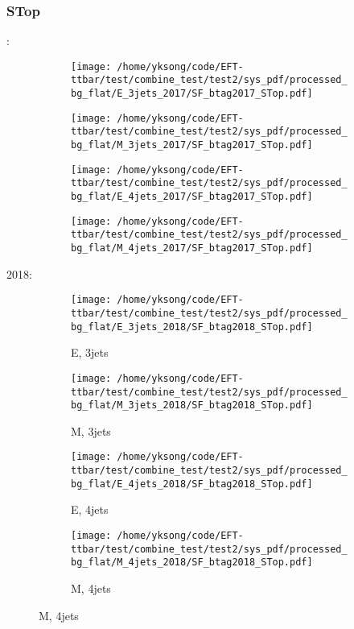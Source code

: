 \documentclass{beamer}
\begin{document}
\begin{frame}
\frametitle{STop}
\fontsize{5}{1}:
\begin{figure}
\centering
\begin{subfigure}[b]{0.24\textwidth}
\texttt{[image: /home/yksong/code/EFT-ttbar/test/combine\_test/test2/sys\_pdf/processed\_bg\_flat/E\_3jets\_2017/SF\_btag2017\_STop.pdf]}
\end{subfigure}
\begin{subfigure}[b]{0.24\textwidth}
\texttt{[image: /home/yksong/code/EFT-ttbar/test/combine\_test/test2/sys\_pdf/processed\_bg\_flat/M\_3jets\_2017/SF\_btag2017\_STop.pdf]}
\end{subfigure}
\begin{subfigure}[b]{0.24\textwidth}
\texttt{[image: /home/yksong/code/EFT-ttbar/test/combine\_test/test2/sys\_pdf/processed\_bg\_flat/E\_4jets\_2017/SF\_btag2017\_STop.pdf]}
\end{subfigure}
\begin{subfigure}[b]{0.24\textwidth}
\texttt{[image: /home/yksong/code/EFT-ttbar/test/combine\_test/test2/sys\_pdf/processed\_bg\_flat/M\_4jets\_2017/SF\_btag2017\_STop.pdf]}
\end{subfigure}
\end{figure}
2018:
\begin{figure}
\centering
\begin{subfigure}[b]{0.24\textwidth}
\texttt{[image: /home/yksong/code/EFT-ttbar/test/combine\_test/test2/sys\_pdf/processed\_bg\_flat/E\_3jets\_2018/SF\_btag2018\_STop.pdf]}
\captionsetup{font=tiny}
\caption{E, 3jets}
\end{subfigure}
\begin{subfigure}[b]{0.24\textwidth}
\texttt{[image: /home/yksong/code/EFT-ttbar/test/combine\_test/test2/sys\_pdf/processed\_bg\_flat/M\_3jets\_2018/SF\_btag2018\_STop.pdf]}
\captionsetup{font=tiny}
\caption{M, 3jets}
\end{subfigure}
\begin{subfigure}[b]{0.24\textwidth}
\texttt{[image: /home/yksong/code/EFT-ttbar/test/combine\_test/test2/sys\_pdf/processed\_bg\_flat/E\_4jets\_2018/SF\_btag2018\_STop.pdf]}
\captionsetup{font=tiny}
\caption{E, 4jets}
\end{subfigure}
\begin{subfigure}[b]{0.24\textwidth}
\texttt{[image: /home/yksong/code/EFT-ttbar/test/combine\_test/test2/sys\_pdf/processed\_bg\_flat/M\_4jets\_2018/SF\_btag2018\_STop.pdf]}
\captionsetup{font=tiny}
\caption{M, 4jets}
\end{subfigure}
\end{figure}
\end{frame}
\end{document}
